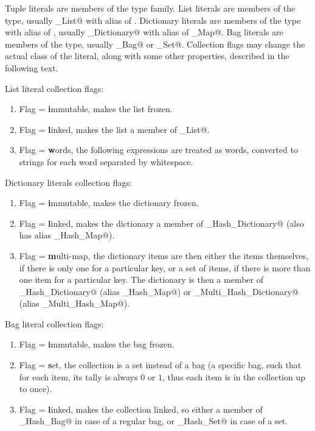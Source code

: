Tuple literals are members of the \lstinline@Tuple@ type family. List literals are members of the \lstinline@List@ type, usually \lstinline@Array_List@ with alias of \lstinline@Array@. Dictionary literals are members of the \lstinline@Dictionary@ type with alias of \lstinline@Map@, usually \lstinline@Hash_Dictionary@ with alias of \lstinline@Hash_Map@. Bag literals are members of the \lstinline@Bag@ type, usually \lstinline@Hash_Bag@ or \lstinline@Hash_Set@. Collection flags may change the actual class of the literal, along with some other properties, described in the following text. 

List literal collection flags: 

\begin{enumerate}
\item Flag \lstinline@i@ = \textbf{i}mmutable, makes the list frozen. 
\item Flag \lstinline@l@ = \textbf{l}inked, makes the list a member of \lstinline@Linked_List@. 
\item Flag \lstinline@w@ = \textbf{w}ords, the following expressions are treated as words, converted to strings for each word separated by whitespace. 
\end{enumerate}

Dictionary literals collection flags:

\begin{enumerate}
\item Flag \lstinline@i@ = \textbf{i}mmutable, makes the dictionary frozen. 
\item Flag \lstinline@l@ = \textbf{l}inked, makes the dictionary a member of \lstinline@Linked_Hash_Dictionary@ (also has alias \lstinline@Linked_Hash_Map@).
\item Flag \lstinline@m@ = \textbf{m}ulti-map, the dictionary items are then either the items themselves, if there is only one for a particular key, or a set of items, if there is more than one item for a particular key. The dictionary is then a member of \lstinline@Multi_Hash_Dictionary@ (alias \lstinline@Multi_Hash_Map@) or \lstinline@Linked_Multi_Hash_Dictionary@ (alias \lstinline@Linked_Multi_Hash_Map@). 
\end{enumerate}

Bag literal collection flags:

\begin{enumerate}
\item Flag \lstinline@i@ = \textbf{i}mmutable, makes the bag frozen. 
\item Flag \lstinline@s@ = \textbf{s}et, the collection is a set instead of a bag (a specific bag, such that for each item, its tally is always $0$ or $1$, thus each item is in the collection up to once). 
\item Flag \lstinline@l@ = \textbf{l}inked, makes the collection linked, so either a member of \lstinline@Linked_Hash_Bag@ in case of a regular bag, or \lstinline@Linked_Hash_Set@ in case of a set. 
\end{enumerate}

